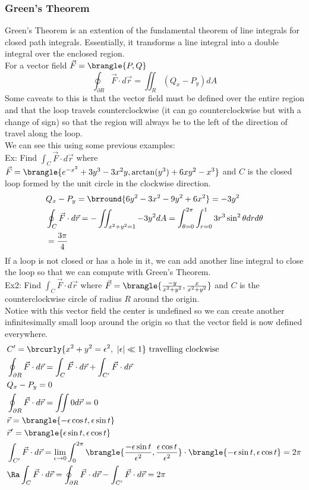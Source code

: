 \subsubsection{Green's Theorem}
Green's Theorem is an extention of the fundamental theorem of line integrals for closed path integrals. Essentially, it transforms a line integral into a double integral over the enclosed region.\\
For a vector field $\vec{F}=\brangle{P,Q}$
$$\oint_{\partial R}\vec{F}\cdot d\vec{r}=\iint_R(Q_x-P_y)dA$$
Some caveats to this is that the vector field must be defined over the entire region and that the loop travels counterclockwise (it can go counterclockwise but with a change of sign) so that the region will always be to the left of the direction of travel along the loop.\\
We can see this using some previous examples:\\
Ex: Find $\int_C\vec{F}\cdot d\vec{r}$ where $\vec{F}=\brangle{e^{-x^2}+3y^3-3x^2y,\arctan(y^3)+6xy^2-x^3}$ and $C$ is the closed loop formed by the unit circle in the clockwise direction.
\begin{align*}
    &Q_x-P_y=\brround{6y^2-3x^2-9y^2+6x^2}=-3y^2\\
    &\oint_C\vec{F}\cdot d\vec{r}=-\iint_{x^2+y^2=1}-3y^2dA=\int_{\theta=0}^{2\pi}\int_{r=0}^13r^3\sin^2\theta drd\theta\\
    &=\frac{3\pi}{4}
\end{align*}
If a loop is not closed or has a hole in it, we can add another line integral to close the loop so that we can compute with Green's Theorem.\\
Ex2: Find $\int_C\vec{F}\cdot d\vec{r}$ where $\vec{F}=\brangle{\frac{-y}{x^2+y^2},\frac{x}{x^2+y^2}}$ and $C$ is the counterclockwise circle of radius $R$ around the origin.\\
Notice with this vector field the center is undefined so we can create another infinitesimally small loop around the origin so that the vector field is now defined everywhere.
\begin{align*}
    &C'=\brcurly{x^2+y^2=\epsilon^2,\ |\epsilon|\ll1}\text{ travelling clockwise}\\
    &\oint_{\partial R}\vec{F}\cdot d\vec{r}=\int_C\vec{F}\cdot d\vec{r}+\int_{C'}\vec{F}\cdot d\vec{r}\\
    &Q_x-P_y=0\\
    &\oint_{\partial R}\vec{F}\cdot d\vec{r}=\iint 0 d\vec{r}=0\\
    &\vec{r}=\brangle{-\epsilon\cos t,\epsilon\sin t}\\
    &\vec{r}'=\brangle{\epsilon\sin t,\epsilon\cos t}\\
    &\int_{C'}\vec{F}\cdot d\vec{r}=\lim_{\epsilon\to0}\int_0^{2\pi}\brangle{\frac{-\epsilon\sin t}{\epsilon^2},\frac{\epsilon\cos t}{\epsilon^2}}\cdot\brangle{-\epsilon\sin t,\epsilon\cos t}=2\pi\\
    &\Ra \int_C\vec{F}\cdot d\vec{r}=\oint_{\partial R}\vec{F}\cdot d\vec{r}-\int_{C'}\vec{F}\cdot d\vec{r}=2\pi
\end{align*}
